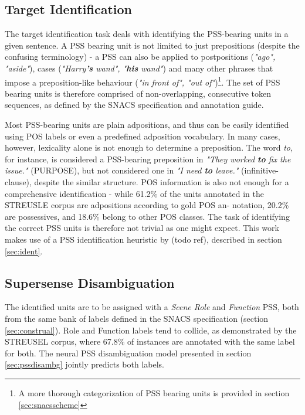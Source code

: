 \subsection{Target Identification}\label{sec:probform_ident}
The target identification task deals with identifying the PSS-bearing units in a given sentence. A PSS bearing unit is not limited to just prepositions (despite the confusing terminology) - a PSS can also be applied to postpositions (\emph{"ago", "aside"}), cases (\emph{"Harry\textbf{'s} wand", "\textbf{his} wand"}) and many other phrases that impose a preposition-like behaviour (\emph{"in front of", "out of"})\footnote{A more thorough categorization of PSS bearing units is provided in section \ref{sec:snacsscheme}}.  The set of PSS bearing units is therefore comprised of non-overlapping, consecutive token sequences, as defined by the SNACS specification and annotation guide. 

Most PSS-bearing units are plain adpositions, and thus can be easily identified using POS labels or even a predefined adposition vocabulary. In many cases, however, lexicality alone is not enough to determine a preposition. The word \emph{to}, for instance, is considered a PSS-bearing preposition in \emph{"They worked \textbf{to} fix the issue."} (PURPOSE), but not considered one in \emph{"I need \textbf{to} leave."} (infinitive-clause), despite the similar structure. POS information is also not enough for a comprehensive identification - while 61.2\% of the units annotated in the STREUSLE corpus are adpositions according to gold POS an-
notation, 20.2\% are possessives, and 18.6\% belong
to other POS classes. The task of identifying the correct PSS units is therefore not trivial as one might expect. This work makes use of a PSS identification heuristic by (todo ref), described in section \ref{sec:ident}.

\subsection{Supersense Disambiguation}\label{sec:probform_disam}

The identified units are to be assigned with a \emph{Scene Role} and \emph{Function} PSS, both from the same bank of labels defined in the SNACS specification (section \ref{sec:construal}). Role and Function labels tend to collide, as demonstrated by the STREUSEL corpus, where 67.8\% of instances are annotated with the same label for both. The neural PSS disambiguation model presented in section \ref{sec:pssdisambg} jointly predicts both labels.

